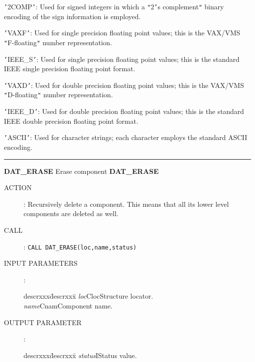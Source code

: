 {{{         \sstitem
         {\tt '}2COMP{\tt '}: Used for signed integers in which a {\tt "}2{\tt '}s complement{\tt "}
         binary encoding of the sign information is employed.

         \sstitem
         {\tt '}VAXF{\tt '}: Used for single precision floating point values; this
         is the VAX/VMS {\tt "}F-floating{\tt "} number representation.

         \sstitem
         {\tt '}IEEE\_S{\tt '}: Used for single precision floating point values;
         this is the standard IEEE single precision floating point format.

         \sstitem
         {\tt '}VAXD{\tt '}: Used for double precision floating point values; this
         is the VAX/VMS {\tt "}D-floating{\tt "} number representation.

         \sstitem
         {\tt '}IEEE\_D{\tt '}: Used for double precision floating point values;
         this is the standard IEEE double precision floating point format.

         \sstitem
         {\tt '}ASCII{\tt '}: Used for character strings; each character employs
         the standard ASCII encoding.
      }
   }
}

\rule{\textwidth}{0.3mm}
{\Large {\bf DAT\_ERASE} \hfill Erase component \hfill {\bf DAT\_ERASE}}
\begin{description}
\item [ACTION]:
Recursively delete a component.
This means that all its lower level components are deleted as well.
\item [CALL]:
{\tt CALL DAT\_ERASE(loc,name,status)}
\item [INPUT PARAMETERS]:
\begin{tabbing}
descrxxx\=descrxxx\=\kill
{\em loc}\>Cloc\>Structure locator.\\
{\em name}\>Cnam\>Component name.
\end{tabbing}
\item [OUTPUT PARAMETER]:
\begin{tabbing}
descrxxx\=descrxxx\=\kill
{\em status}\>I\>Status value.
\end{tabbing}
\end{description}
\goodbreak

